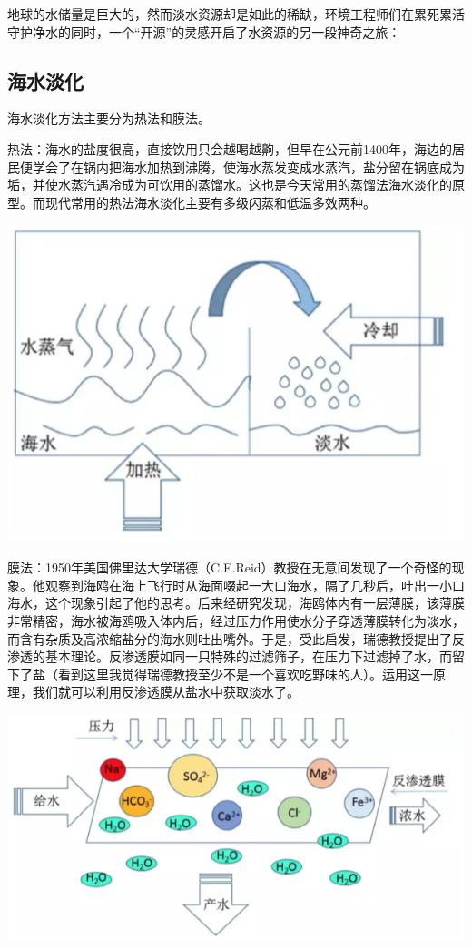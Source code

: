 \documentclass[]{book}
\begin{document}
地球的水储量是巨大的，然而淡水资源却是如此的稀缺，环境工程师们在累死累活守护净水的同时，一个``开源''的灵感开启了水资源的另一段神奇之旅：

\hypertarget{ux6d77ux6c34ux6de1ux5316}{%
\subsection{海水淡化}\label{ux6d77ux6c34ux6de1ux5316}}

海水淡化方法主要分为热法和膜法。

热法：海水的盐度很高，直接饮用只会越喝越齁，但早在公元前1400年，海边的居民便学会了在锅内把海水加热到沸腾，使海水蒸发变成水蒸汽，盐分留在锅底成为垢，并使水蒸汽遇冷成为可饮用的蒸馏水。这也是今天常用的蒸馏法海水淡化的原型。而现代常用的热法海水淡化主要有多级闪蒸和低温多效两种。

\includegraphics[width=8.33in]{images/seawater1}

膜法：1950年美国佛里达大学瑞德（C.E.Reid）教授在无意间发现了一个奇怪的现象。他观察到海鸥在海上飞行时从海面啜起一大口海水，隔了几秒后，吐出一小口海水，这个现象引起了他的思考。后来经研究发现，海鸥体内有一层薄膜，该薄膜非常精密，海水被海鸥吸入体内后，经过压力作用使水分子穿透薄膜转化为淡水，而含有杂质及高浓缩盐分的海水则吐出嘴外。于是，受此启发，瑞德教授提出了反渗透的基本理论。反渗透膜如同一只特殊的过滤筛子，在压力下过滤掉了水，而留下了盐（看到这里我觉得瑞德教授至少不是一个喜欢吃野味的人）。运用这一原理，我们就可以利用反渗透膜从盐水中获取淡水了。

\includegraphics[width=8.33in]{images/seawater2}
\end{document}
